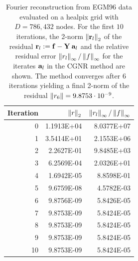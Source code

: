 \begin{example}
		\begin{table}[h]
		  \begin{center}
         \begin{tabular}{r|r|r}
         Iteration & $\left\|r\right\|_{2}$ & $\left\|r_{l}\right\|_{\infty}/\left\|f\right\|_{\infty}$ \\[0.7ex] \hline
                 0 &    1.1913E+04 &        8.0377E+07 \\
                 1 &    3.5414E+01 &        2.1553E+06 \\
                 2 &    2.2627E-01 &        9.8485E+03 \\
                 3 &    6.2569E-04 &        2.0326E+01 \\
                 4 &    1.6942E-05 &        8.8598E-01 \\
                 5 &    9.6759E-08 &        4.5782E-03 \\
                 6 &    9.8756E-09 &        5.8426E-05 \\
                 7 &    9.8753E-09 &        5.8424E-05 \\
                 8 &    9.8753E-09 &        5.8424E-05 \\
                 9 &    9.8753E-09 &        5.8424E-05 \\
                10 &    9.8753E-09 &        5.8424E-05 \\
        \end{tabular}
		  \end{center}
		  \caption{Fourier reconstruction from EGM96 data evaluated on a healpix grid with $D=786,432$ nodes. 
		  For the first $10$ iterations, the 2-norm $\left\|\mathbf{r}_{l}\right\|_{2}$ of the residual $\mathbf{r}_{l} := \mathbf{f} - 
		  \mathbf{Y}\:\mathbf{a}_{l}$ and the relative residual error $\left\|r_{l}\right\|_{\infty}/\left\|f\right\|_{\infty}$ 
		  for the iterates $\mathbf{a}_{l}$ in the CGNR method are shown. The method converges after $6$ iterations
		  yielding a final 2-norm of the residual $\left\|r_{6}\right\| = 9.8753 \cdot 10^{-9}$.}
		  \label{tab:Healpix}
		\end{table}
		
  \end{example}
  
